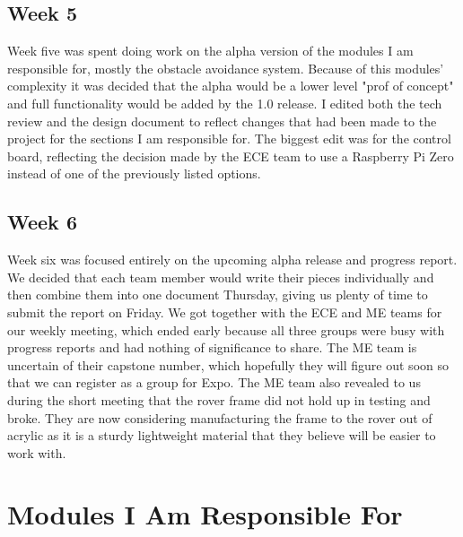 \documentclass[10pt,letterpaper,onecolumn,draftclsnofoot,journal]{IEEEtran}
\begin{document}
\subsection{Week 5}
Week five was spent doing work on the alpha version of the modules I am responsible for, mostly the obstacle avoidance system. Because of this modules' complexity it was decided that the alpha would be a lower level "prof of concept" and full functionality would be added by the 1.0 release. I edited both the tech review and the design document to reflect changes that had been made to the project for the sections I am responsible for. The biggest edit was for the control board, reflecting the decision made by the ECE team to use a Raspberry Pi Zero instead of one of the previously listed options.

\subsection{Week 6}
Week six was focused entirely on the upcoming alpha release and progress report. We decided that each team member would write their pieces individually and then combine them into one document Thursday, giving us plenty of time to submit the report on Friday. We got together with the ECE and ME teams for our weekly meeting, which ended early because all three groups were busy with progress reports and had nothing of significance to share. The ME team is uncertain of their capstone number, which hopefully they will figure out soon so that we can register as a group for Expo. The ME team also revealed to us during the short meeting that the rover frame did not hold up in testing and broke. They are now considering manufacturing the frame to the rover out of acrylic as it is a sturdy lightweight material that they believe will be easier to work with.

\section{Modules I Am Responsible For}
\end{document}
